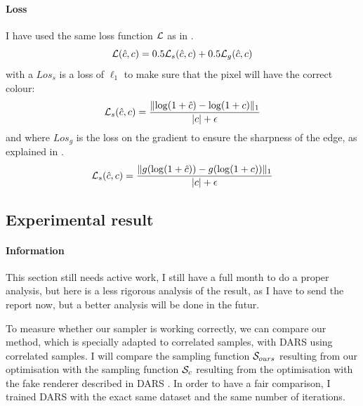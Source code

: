 \documentclass{classeENS}
\begin{document}
\paragraph*{Loss} I have used the same loss function $\mathcal L$ as in \cite{kuznetsov2018deep}.
\begin{equation}
    \label{eq:6}
    \mathcal L(\hat c,c) = 0.5\mathcal L_s(\hat c,c) + 0.5\mathcal L_g(\hat c,c) 
\end{equation}
with a $Los_s$ is a loss of $\ell_1$ to make sure that the pixel will have the correct colour:
\begin{equation}
    \label{eq:7}
    \mathcal L_s(\hat c,c) = \frac{\lVert \log(1+\hat c) - \log(1+c) \rVert_1}{|c| + \epsilon}
\end{equation}
and where $Los_g$ is the loss on the gradient to ensure the sharpness of the edge, as explained in \cite{5617283}.
\begin{equation}
    \label{eq:8}
    \mathcal L_s(\hat c,c) = \frac{\lVert g(\log(1+\hat c)) - g(\log(1+c)) \rVert_1}{|c| + \epsilon}
\end{equation}

\subsection{Experimental result}

\paragraph*{Information} This section still needs active work, I still have a full 
month to do a proper analysis, but here is a less rigorous analysis of the result, 
as I have to send the report now, but a better analysis will be done in the futur.

To measure whether our sampler is working correctly, we can compare our method, 
which is specially adapted to correlated samples, with DARS using correlated 
samples. I will compare the sampling function $\mathcal S_{ours}$ resulting from our 
optimisation with the sampling function $\mathcal S_{c}$ resulting from the optimisation 
with the fake renderer described in DARS \cite{kuznetsov2018deep}. In order to 
have a fair comparison, I trained DARS with the exact same dataset and the same 
number of iterations.
\end{document}
